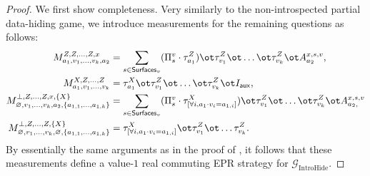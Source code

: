 \documentclass[11pt]{article}
\newcommand{\game}{\mathscr{G}}
\newcommand{\reg}[1]{{\mathsf{#1}}}
\newcommand{\surfaces}[1]{\mathsf{Surfaces}_{#1}}
\begin{document}
  \begin{proof}
    We first show completeness. Very similarly to the non-introspected
    partial data-hiding game, we introduce measurements for the
    remaining questions as follows:
    \begin{align*}
      M^{Z, Z, \dots, Z, x}_{a_1, v_1, \dots, v_k, a_2} &= \sum_{s \in
                                                          \surfaces{v}}
                                                          (\Pi^{v}_s \cdot
                                                          \tau^Z_{a_1})
                                                          \ot
                                                          \tau^Z_{v_1}
                                                          \ot \dots
                                                          \ot
                                                          \tau^Z_{v_k}
                                                          \ot
                                                          A^{x,s,v}_{a_2},
      \\
      M^{X, Z, \dots, Z}_{a_1, v_1, \dots, v_k} &= \tau^X_{a_1} \ot
                                                  \tau^Z_{v_1} \ot
                                                  \dots \ot
                                                  \tau^Z_{v_k} \ot I_{\reg{aux}},\\
      M^{\bot, Z, \dots, Z, x, \{X\}}_{\varnothing, v_1, \dots, v_k,
      a_2, \{a_{1,1}, \dots, a_{1,k}\}} &= \sum_{s \in \surfaces{v}}
                                         ( \Pi^{v}_s \cdot \tau^X_{[\forall
                                          i,  a_1 \cdot v_i = a_{1, i}]})
                                          \ot \tau^Z_{v_1} \ot \dots
                                          \ot \tau^Z_{v_k} \ot
                                          A^{x,s,v}_{a_2,} \\
      M^{\bot, Z, \dots, Z, \{X\}}_{\varnothing, v_1, \dots, v_k,
      \varnothing, \{a_{1,1}, \dots, a_{1,k}\}} &=\tau^X_{[\forall i,
                                                  a_1 \cdot v_i = a_{1,i}]} \ot \tau^Z_{v_1}
                                                  \ot \dots
                                                  \tau^Z_{v_k} .
    \end{align*}
    By essentially the same arguments as in the proof of , it
    follows that these measurements define a value-$1$ real commuting
    EPR strategy for $\game_{\mathrm{IntroHide}}$.


\end{proof}
\end{document}
